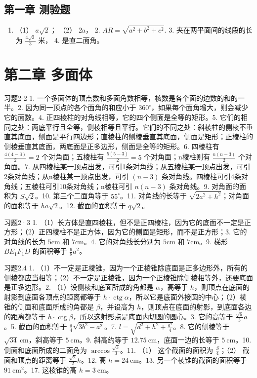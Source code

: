 \subsection{第一章
测验题}

\begin{enumerate}
\item
  （1） \(a\sqrt{2}\)； （2） 2a， 2. \(AR = \sqrt{a^2 + b^2 + c^2}\).
  3. 夹在两平面间的线段的长为 \(\frac{4\sqrt{3}}{3}\) 米， 4.
  是直二面角。
\end{enumerate}

\section{第二章 多面体}

习题2-2 1.
一个多面体的顶点数和多面角数相等，核数是各个面的边数的和的一半。2.
因为同一顶点的各个面角的和应小于
\(360^{\circ}\)，如果每个面角增大，则会减少它的面数。4.
正四棱柱的对角线相等，它的四个侧面是全等的矩形。5.
它们的相同之处：两底平行且全等，侧棱相等且平行。它们的不同之处：斜棱柱的侧棱不垂直其底面，侧面是平行四边形；直棱柱的侧棱垂直其底面，侧面是矩形；正棱柱的侧棱垂直其底面，两底面是正多边形，侧面是全等的矩形。6.
四棱柱有 \(\frac{4(4 - 3)}{2} = 2\) 个对角面；五棱柱有
\(\frac{5(5 - 3)}{2} = 5\) 个对角面；n棱柱则有 \(\frac{n(n - 3)}{2}\)
个对角面。7.
从四棱柱某一顶点出发，可引1条对角线；从五棱柱某一顶点出发，可引2条对角线；从n棱柱某一顶点出发，可引
\((n - 3)\)
条对角线。四棱柱可引4条对角线；五棱柱可引10条对角线；n棱柱可引
\(n(n - 3)\) 条对角线。9. 对角面的面积为 \(S\sqrt{2}\)。10.
第三个二面角等于 \(55^{\circ}\)。11. 对角线的长等于
\(\sqrt{2a^{2} + h^{2}}\)；对角面的面积等于 \(ha\sqrt{2}\)。12.
截面的面积等于 \(q\sqrt{2}\)。

习题2·3 1.
（1）长方体是直四棱柱，但不是正四棱柱，因为它的底面不一定是正方形；（2）正四棱柱不是正方体，因为它的侧面是矩形，而不是正方形；3.
它的对角线的长为 \(5\mathrm{cm}\) 和 \(7\mathrm{cm}\)。4.
它的对角线长分别为 \(5\mathrm{cm}\) 和 \(7\mathrm{cm}\)。9. 梯形
\(BE_{1}F_{1}D\) 的面积等于 \(\frac{9}{8} a^{2}\)。

习题2.4 1.
（1）不一定是正棱锥，因为一个正棱锥除底面是正多边形外，所有的侧棱都应当相等；（2）不一定是正棱锥，因为一个正棱锥除侧棱相等外，还要底面是正多边形。2.
（1）设侧棱和底面所成的角都是 \(\alpha\)，高等于
\(h\)，则顶点在底面的射影到底面各顶点的距离都等于
\(h \cdot \operatorname{ctg} \alpha\)，所以它是底面外接圆的中心；（2）棱锥的侧面和底面所成的角都是
\(\beta\)，并设高为 \(h\)，则顶点在底面的射影，到底面各边的距离都等于
\(h \cdot \operatorname{ctg} \beta\)，所以这射影点是底面内切圆的圆心。3.
它的高等于 \(\frac{\sqrt{6}}{3} a\)。5. 截面的面积等于
\(\frac{a}{4} \sqrt{3b^2 - a^2}\)。7.
\(l = \sqrt{d^2 + h^2 + \frac{a^2}{4}}\)。8. 它的侧棱等于
\(\sqrt{34} \mathrm{~cm}\)，斜高等于 \(5 \mathrm{~cm}\)。9. 斜高约等于
\(12.75 \mathrm{~cm}\)，底面一边的长等于 \(5 \mathrm{~cm}\)。10.
侧面和底面所成的二面角为 \(\arccos \frac{\sqrt{3}}{3}\)。11. （1）
这个截面的面积为 \(\frac{S}{4}\)；（2） 截面和顶点的距离等于
\(\frac{\sqrt{2}}{2} h\)。12. 高 \(h = 24 \mathrm{~cm}\)。13.
另一个棱锥的截面的面积等于 \(91 \mathrm{~cm}^2\)。17. 这棱锥的高
\(h = 3 \mathrm{~cm}\)。

